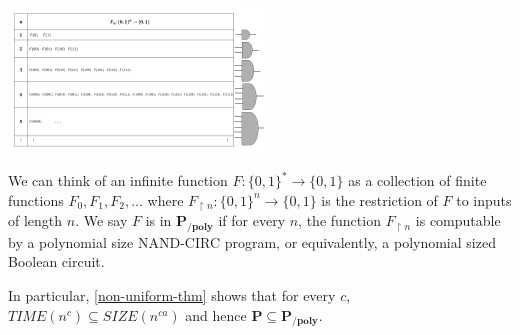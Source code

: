 \begin{marginfigure}
\centering
\includegraphics[width=\linewidth, height=1.5in, keepaspectratio]{../figure/Ppoly.png}
\caption{We can think of an infinite function
\(F:\{0,1\}^* \rightarrow \{0,1\}\) as a collection of finite functions
\(F_0,F_1,F_2,\ldots\) where
\(F_{\upharpoonright n}:\{0,1\}^n \rightarrow \{0,1\}\) is the
restriction of \(F\) to inputs of length \(n\). We say \(F\) is in
\(\mathbf{P_{/poly}}\) if for every \(n\), the function
\(F_{\upharpoonright n}\) is computable by a polynomial size NAND-CIRC
program, or equivalently, a polynomial sized Boolean circuit.}
\label{Ppolyfig}
\end{marginfigure}

\hypertarget{non-uniform-thm}{}

In particular, \cref{non-uniform-thm} shows that for every \(c\),
\(\ensuremath{\mathit{TIME}}(n^c) \subseteq \ensuremath{\mathit{SIZE}}(n^{ca})\)
and hence \(\mathbf{P} \subseteq \mathbf{P_{/poly}}\).

